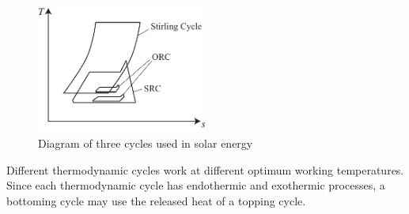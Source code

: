 \begin{figure}[h]
\centering 
\includegraphics[width=0.5\textwidth]{fig/cycles}
\caption{Diagram of three cycles used in solar energy}\label{fig:cycles}
\end{figure}

Different thermodynamic cycles work at different optimum working temperatures. Since each thermodynamic cycle has endothermic and exothermic processes, a bottoming cycle may use the released heat of a topping cycle.


